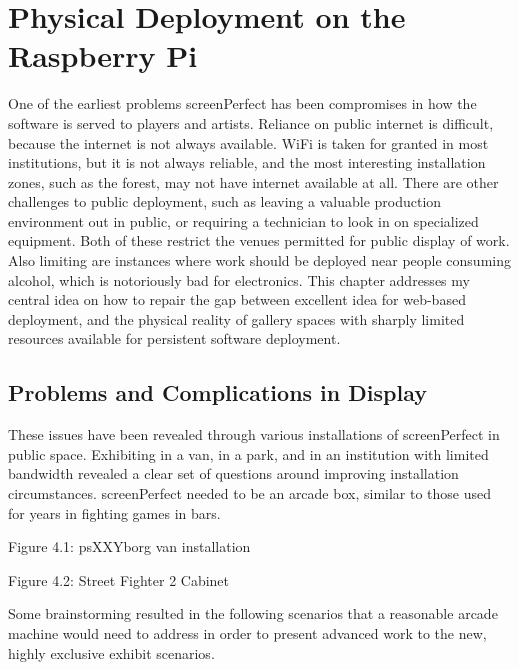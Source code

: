 \section{Physical Deployment on the Raspberry Pi}
One of the earliest problems screenPerfect has been compromises in how the software is served to players and artists. Reliance on public internet is difficult, because the internet is not always available. WiFi is taken for granted in most institutions, but it is not always reliable, and the most interesting installation zones, such as the forest, may not have internet available at all. 
There are other challenges to public deployment, such as leaving a valuable production environment out in public, or requiring a technician to look in on specialized equipment. Both of these restrict the venues permitted for public display of work. Also limiting are instances where work should be deployed near people consuming alcohol, which is notoriously bad for electronics.
This chapter addresses my central idea on how to repair the gap between excellent idea for web-based deployment, and the physical reality of gallery spaces with sharply limited resources available for persistent software deployment. 

\subsection{Problems and Complications in Display}
These issues have been revealed through various installations of screenPerfect in public space. Exhibiting in a van, in a park, and in an institution with limited bandwidth revealed a clear set of questions around improving installation circumstances. screenPerfect needed to be an arcade box, similar to those used for years in fighting games in bars.

Figure 4.1: psXXYborg van installation


Figure 4.2: Street Fighter 2 Cabinet


 
Some brainstorming resulted in the following scenarios that a reasonable arcade machine would need to address in order to present advanced work to the new, highly exclusive exhibit scenarios. 

